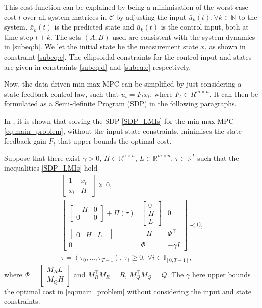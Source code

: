 This cost function can be explained by being a minimisation of the worst-case cost $l$ over all system matrices in $\mathcal{C}$ by adjusting the input $\bar{u}_k(t), \forall k \in \mathbb{N}$ to the system. $\bar{x}_k(t)$ is the predicted state and $\bar{u}_k(t)$ is the control input, both at time step $t+k$.
The sets $(A,B)$ used are consistent with the system dynamics in \eqref{subeq:b}. We let the initial state be the measurement state $x_t$ as shown in constraint \eqref{subeq:c}.
The ellipsoidal constraints for the control input and states are given in constraints \eqref{subeq:d} and \eqref{subeq:e} respectively.

Now, the data-driven min-max MPC can be simplified by just considering a state-feedback control law, such that $u_t = F_t x_t$, where $F_t \in R^{m \times n}$. It can then be formulated as a Semi-definite Program (SDP) in the following paragraphs.

In \cite{xie2024}, it is shown that solving the SDP \eqref{SDP_LMIs} for the min-max MPC \eqref{eq:main_problem}, without the input state constraints, minimises the state-feedback gain $F_t$ that upper bounds the optimal cost.


Suppose that there exist $\gamma > 0$, $H \in \mathbb{R}^{n \times n}$, $L \in \mathbb{R}^{m \times n}$, $\tau \in \mathbb{R}^T$ such that the inequalities \eqref{SDP_LMIs} hold
	\begin{subequations} \label{SDP_LMIs}
		\begin{gather}
			\begin{bmatrix}
				1 & x_t^\top \\
				x_t & H
			\end{bmatrix} \succeq 0,
			\\
			\begin{bmatrix}
				\begin{bmatrix}
				-H & 0 \\
				 0 & 0
				\end{bmatrix}
				+
				\Pi(\tau)
				&
				\begin{bmatrix}
					0 \\
				    H \\
				    L
				\end{bmatrix}
				&
				0 \\
				\begin{bmatrix}
				0 & H & L^\top
				\end{bmatrix}
				& -H & \Phi^\top \\
				0 & \Phi & -\gamma I
			\end{bmatrix} \prec 0,
			\\
			\tau = (\tau_0, \ldots, \tau_{T-1}), \ \tau_i \geq 0, \ \forall i \in \mathbb{I}_{[0, T-1]},
		\end{gather}
	\end{subequations}
where $\Phi = \begin{bmatrix} M_R L \\ M_Q H \end{bmatrix}$ and $M_R^\top M_R = R$, $M_Q^\top M_Q = Q$.
The $\gamma$ here upper bounds the optimal cost in \eqref{eq:main_problem} without considering the input and state constraints.

